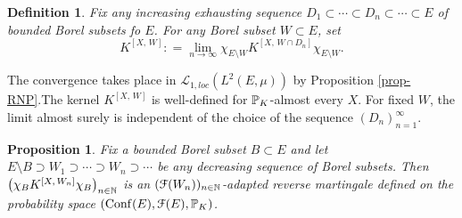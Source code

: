 \documentclass[12pt]{paper}
\newtheorem{proposition}[theorem]{Proposition}
\newtheorem{definition}[theorem]{Definition}
\numberwithin{theorem}{section}
\numberwithin{figure}{section}
\numberwithin{equation}{section}
\begin{document}
\begin{definition}\label{def-unbdd}
Fix any increasing exhausting sequence $D_1 \subset \cdots \subset D_n \subset \cdots \subset E$ of bounded Borel subsets fo $E$.  For any Borel subset $W\subset E$, set
\[
K^{[X, \, W]}: = \lim_{n\to\infty} \chi_{E\setminus W} K^{[X,\, W\cap D_n]} \chi_{E\setminus W}.
\]
\end{definition}
The convergence takes place in $\mathscr{L}_{1, loc}(L^2(E,\mu))$ by Proposition \ref{prop-RNP}.The kernel $K^{[X, \, W]}$ is well-defined  for  $\mathbb{P}_K$-almost every $X$. For fixed $W$, the limit almost surely is independent of the choice of the sequence $(D_n)_{n=1}^\infty$.








\begin{proposition}\label{prop-re-mart}
Fix a bounded Borel subset $B \subset E$ and let $E\setminus B \supset W_1 \supset \cdots \supset W_n \supset \cdots$ be any decreasing sequence of Borel subsets.  Then $\big(\chi_B K^{[X, \, W_n]} \chi_B\big)_{n\in\mathbb{N}}$ is an $(\mathcal{F}(W_n))_{n\in\mathbb{N}}$-adapted reverse martingale defined on the probability space $(\mathrm{Conf}(E), \mathcal{F}(E), \mathbb{P}_K)$.
\end{proposition}
\end{document}
